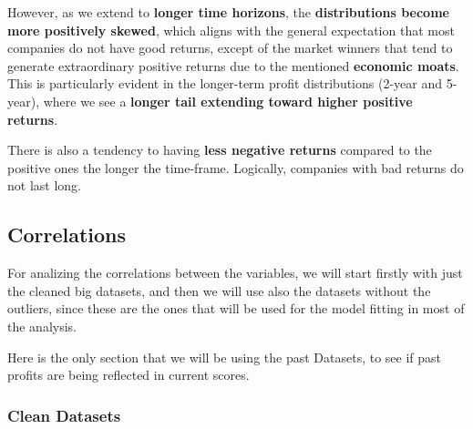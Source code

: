\documentclass[11pt,english,a4paper,hidelinks]{book}
\begin{document}
\vspace{0.5cm}
\noindent However, as we extend to \textbf{longer time horizons}, the \textbf{distributions become more positively skewed}, which aligns with the general expectation that most companies do not have good returns, except of the market winners that tend to generate extraordinary positive returns due to the mentioned \textbf{economic moats}. This is particularly evident in the longer-term profit distributions (2-year and 5-year), where we see a \textbf{longer tail extending toward higher positive returns}.


\vspace{0.5cm}
\noindent There is also a tendency to having \textbf{less negative returns} compared to the positive ones the longer the time-frame. Logically, companies with bad returns do not last long.

\subsection{Correlations}

For analizing the correlations between the variables, we will start firstly with just the cleaned big datasets, and then we will use also the datasets without the outliers, since these are the ones that will be used for the model fitting in most of the analysis.

\vspace{0.5cm}
\noindent Here is the only section that we will be using the past Datasets, to see if past profits are being reflected in current scores.
\subsubsection{Clean Datasets}
\end{document}
